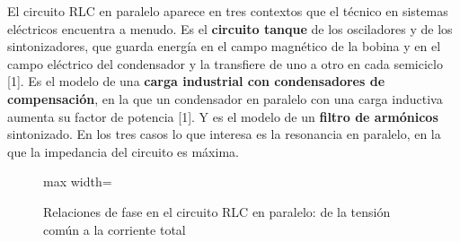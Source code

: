 \documentclass[11pt,letterpaper]{article}
\begin{document}
El circuito RLC en paralelo aparece en tres contextos que el técnico en sistemas eléctricos encuentra a menudo. Es el \textbf{circuito tanque} de los osciladores y de los sintonizadores, que guarda energía en el campo magnético de la bobina y en el campo eléctrico del condensador y la transfiere de uno a otro en cada semiciclo [1]. Es el modelo de una \textbf{carga industrial con condensadores de compensación}, en la que un condensador en paralelo con una carga inductiva aumenta su factor de potencia [1]. Y es el modelo de un \textbf{filtro de armónicos} sintonizado. En los tres casos lo que interesa es la resonancia en paralelo, en la que la impedancia del circuito es máxima.

\begin{figure}[H]
  \centering
  \begin{adjustbox}{max width=\linewidth}
  \end{adjustbox}
  \caption{Relaciones de fase en el circuito RLC en paralelo: de la tensión común a la corriente total}
\end{figure}
\end{document}
